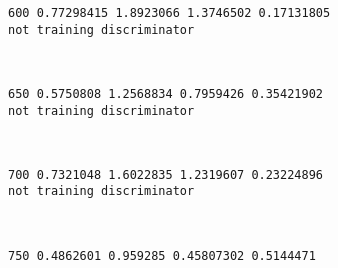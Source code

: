 \documentclass[11pt]{article}
\begin{document}
    \begin{Verbatim}[commandchars=\\\{\}]
600 0.77298415 1.8923066 1.3746502 0.17131805
not training discriminator

    \end{Verbatim}

    \begin{center}
    \end{center}
    { \hspace*{\fill} \\}
    
    \begin{Verbatim}[commandchars=\\\{\}]
650 0.5750808 1.2568834 0.7959426 0.35421902
not training discriminator

    \end{Verbatim}

    \begin{center}
    \end{center}
    { \hspace*{\fill} \\}
    
    \begin{Verbatim}[commandchars=\\\{\}]
700 0.7321048 1.6022835 1.2319607 0.23224896
not training discriminator

    \end{Verbatim}

    \begin{center}
    \end{center}
    { \hspace*{\fill} \\}
    
    \begin{Verbatim}[commandchars=\\\{\}]
750 0.4862601 0.959285 0.45807302 0.5144471

    \end{Verbatim}

    \begin{center}
    \end{center}
    { \hspace*{\fill} \\}
    
\end{document}
